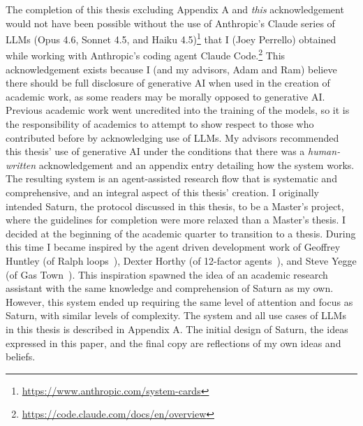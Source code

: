 \documentclass[12pt]{report}
\begin{document}
The completion of this thesis excluding Appendix A and \textit{this} acknowledgement would not have been possible without the use of Anthropic's Claude series of LLMs (Opus 4.6, Sonnet 4.5, and Haiku 4.5)\footnote{\url{https://www.anthropic.com/system-cards}} that I (Joey Perrello) obtained while working with Anthropic's coding agent Claude Code.\footnote{\url{https://code.claude.com/docs/en/overview}}  This acknowledgement exists because I (and my advisors, Adam and Ram) believe there should be full disclosure of generative AI when used in the creation of academic work, as some readers may be morally opposed to generative AI. Previous academic work went uncredited into the training of the models, so it is the responsibility of academics to attempt to show respect to those who contributed before by acknowledging use of LLMs. My advisors recommended this thesis' use of generative AI under the conditions that there was a \textit{human-written} acknowledgement and an appendix entry detailing how the system works. The resulting system is an agent-assisted research flow that is systematic and comprehensive, and an integral aspect of this thesis' creation. I originally intended Saturn, the protocol discussed in this thesis, to be a Master's project, where the guidelines for completion were more relaxed than a Master's thesis. I decided at the beginning of the academic quarter to transition to a thesis. During this time I became inspired by the agent driven development work of Geoffrey Huntley (of Ralph loops~\cite{huntley2025ralph}), Dexter Horthy (of 12-factor agents~\cite{horthy2025agents}), and Steve Yegge (of Gas Town~\cite{yegge2026gastown}).  This inspiration spawned the idea of an academic research assistant with the same knowledge and comprehension of Saturn as my own. However, this system ended up requiring the same level of attention and focus as Saturn, with similar levels of complexity. The system and all use cases of LLMs in this thesis is described in Appendix A. The initial design of Saturn, the ideas expressed in this paper, and the final copy are reflections of my own ideas and beliefs.

\newpage

\setcounter{page}{1}




\end{document}
